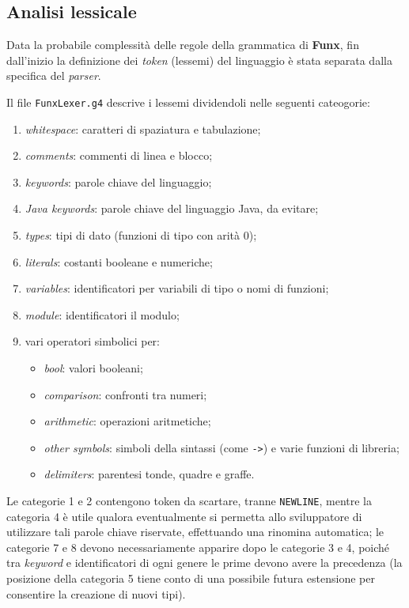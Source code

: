 \subsection{Analisi lessicale}
\label{sec:5-2-lexical-analysis}

Data la probabile complessità delle regole della grammatica di \textbf{Funx}, fin dall'inizio la definizione dei \textit{token} (lessemi)
del linguaggio è stata separata dalla specifica del \textit{parser}.

\noindent Il file \texttt{FunxLexer.g4} descrive i lessemi dividendoli nelle seguenti cateogorie:
\begin{enumerate}
    \item \textit{whitespace}: caratteri di spaziatura e tabulazione;
    \item \textit{comments}: commenti di linea e blocco;
    \item \textit{keywords}: parole chiave del linguaggio;
    \item \textit{Java keywords}: parole chiave del linguaggio Java, da evitare;
    \item \textit{types}: tipi di dato (funzioni di tipo con arità 0);
    \item \textit{literals}: costanti booleane e numeriche;
    \item \textit{variables}: identificatori per variabili di tipo o nomi di funzioni;
    \item \textit{module}: identificatori il modulo;
    \item vari operatori simbolici per:
          \begin{itemize}
              \item \textit{bool}: valori booleani;
              \item \textit{comparison}: confronti tra numeri;
              \item \textit{arithmetic}: operazioni aritmetiche;
              \item \textit{other symbols}: simboli della sintassi (come \texttt{->}) e varie funzioni di libreria;
              \item \textit{delimiters}: parentesi tonde, quadre e graffe.
          \end{itemize}
\end{enumerate}

\noindent Le categorie 1 e 2 contengono token da scartare, tranne \texttt{NEWLINE}, mentre la categoria 4 è utile
qualora eventualmente si permetta allo sviluppatore di utilizzare tali parole chiave riservate,
effettuando una rinomina automatica; le categorie 7 e 8 devono necessariamente apparire dopo le categorie 3 e 4,
poiché tra \textit{keyword} e identificatori di ogni genere le prime devono avere la precedenza
(la posizione della categoria 5 tiene conto di una possibile futura estensione per consentire la creazione di nuovi tipi).

